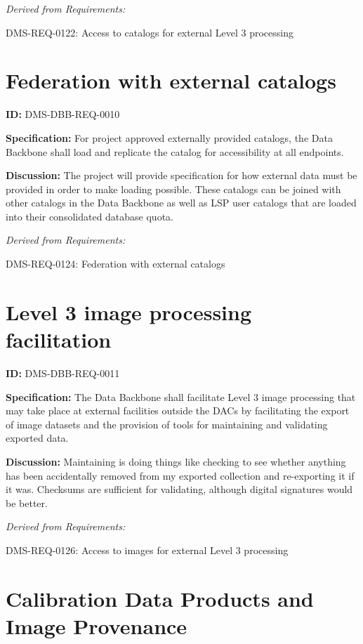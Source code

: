 \documentclass[SE,toc,lsstdraft]{lsstdoc}
\begin{document}
\emph{Derived from Requirements:}

DMS-REQ-0122:
Access to catalogs for external Level 3 processing \newline

\section{Federation with external catalogs}

\label{DMS-DBB-REQ-0010}
\textbf{ID:} DMS-DBB-REQ-0010

\textbf{Specification:}
For project approved externally provided catalogs, the Data Backbone shall load and replicate the catalog for accessibility at all endpoints.

\textbf{Discussion:}
The project will provide specification for how external data must be provided in order to make loading possible.    These catalogs can be joined with other catalogs in the Data Backbone as well as LSP user catalogs that are loaded into their consolidated database quota.

\emph{Derived from Requirements:}

DMS-REQ-0124:
Federation with external catalogs \newline

\section{Level 3 image processing facilitation}

\label{DMS-DBB-REQ-0011}
\textbf{ID:} DMS-DBB-REQ-0011

\textbf{Specification:}
The Data Backbone shall facilitate Level 3 image processing that may take place at external
 facilities outside the DACs by facilitating the export of image
 datasets and the provision of tools for maintaining and validating exported data.

\textbf{Discussion:}
Maintaining is doing things like checking to see whether anything has been accidentally removed from my exported collection and re-exporting it if it was.  Checksums are sufficient for validating, although digital signatures would be better.

\emph{Derived from Requirements:}

DMS-REQ-0126:
Access to images for external Level 3 processing \newline

\section{Calibration Data Products and Image Provenance}
\end{document}
